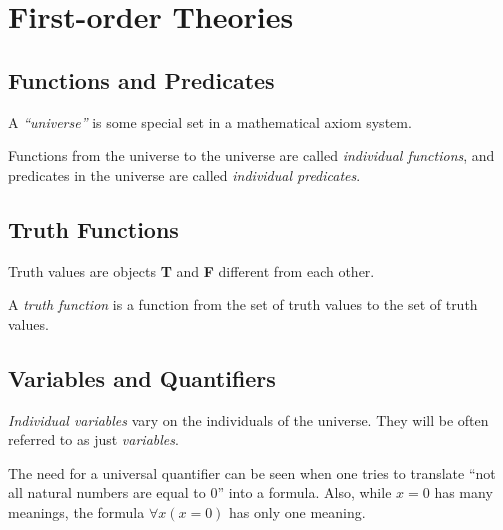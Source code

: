 \section{First-order Theories}

\subsection{Functions and Predicates}

\begin{definition}[``Universe'']
	A \emph{``universe''} is some special set in a mathematical axiom system.
\end{definition}

\begin{definition}
	Functions from the universe to the universe are called \emph{individual functions}, and predicates
	in the universe are called \emph{individual predicates}.
\end{definition}

\subsection{Truth Functions}

\begin{definition}
	Truth values are objects \textbf{T} and \textbf{F} different from each other.
\end{definition}

\begin{definition}
	A \emph{truth function} is a function from the set of truth values to the set of truth values.
\end{definition}

\subsection{Variables and Quantifiers}

\begin{definition}
	\emph{Individual variables} vary on the individuals of the universe. They will be often
	referred to as just \emph{variables}.
\end{definition}

\begin{remark}
	The need for a universal quantifier can be seen when one tries to translate 
	``not all natural numbers are equal to 0'' into a formula. Also, while $x=0$ has many
	meanings, the formula $\forall x (x=0)$ has only one meaning.
\end{remark}

